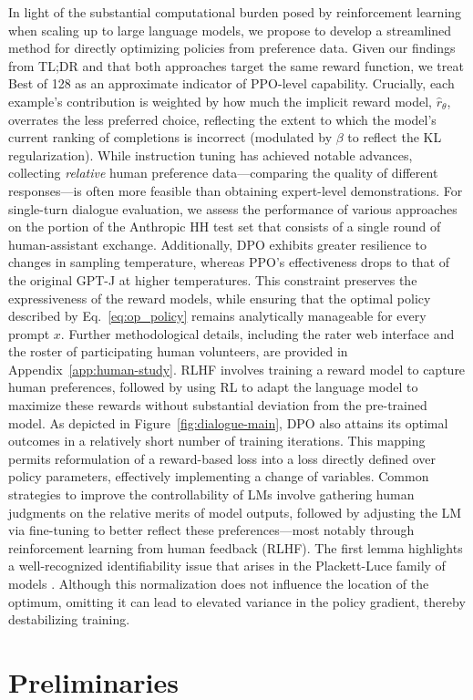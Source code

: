 \begin{lemma}
\begin{sproof}
In light of the substantial computational burden posed by reinforcement learning when scaling up to large language models, we propose to develop a streamlined method for directly optimizing policies from preference data. Given our findings from TL;DR and that both approaches target the same reward function, we treat Best of 128 as an approximate indicator of PPO-level capability. Crucially, each example’s contribution is weighted by how much the implicit reward model, $\hat{r}_\theta$, overrates the less preferred choice, reflecting the extent to which the model’s current ranking of completions is incorrect (modulated by $\beta$ to reflect the KL regularization). While instruction tuning has achieved notable advances, collecting \textit{relative} human preference data—comparing the quality of different responses—is often more feasible than obtaining expert-level demonstrations. For single-turn dialogue evaluation, we assess the performance of various approaches on the portion of the Anthropic HH test set \citep{bai2022training} that consists of a single round of human-assistant exchange. Additionally, DPO exhibits greater resilience to changes in sampling temperature, whereas PPO's effectiveness drops to that of the original GPT-J at higher temperatures. This constraint preserves the expressiveness of the reward models, while ensuring that the optimal policy described by Eq.~\ref{eq:op_policy} remains analytically manageable for every prompt $x$. Further methodological details, including the rater web interface and the roster of participating human volunteers, are provided in Appendix~\ref{app:human-study}. RLHF involves training a reward model to capture human preferences, followed by using RL to adapt the language model to maximize these rewards without substantial deviation from the pre-trained model. As depicted in Figure~\ref{fig:dialogue-main}, DPO also attains its optimal outcomes in a relatively short number of training iterations. This mapping permits reformulation of a reward-based loss into a loss directly defined over policy parameters, effectively implementing a change of variables. Common strategies to improve the controllability of LMs involve gathering human judgments on the relative merits of model outputs, followed by adjusting the LM via fine-tuning to better reflect these preferences—most notably through reinforcement learning from human feedback (RLHF). The first lemma highlights a well-recognized identifiability issue that arises in the Plackett-Luce family of models \cite{plackett1975analysis}. Although this normalization does not influence the location of the optimum, omitting it can lead to elevated variance in the policy gradient, thereby destabilizing training. \section{Preliminaries}\label{section:prelims}


\end{sproof}
\end{lemma}
